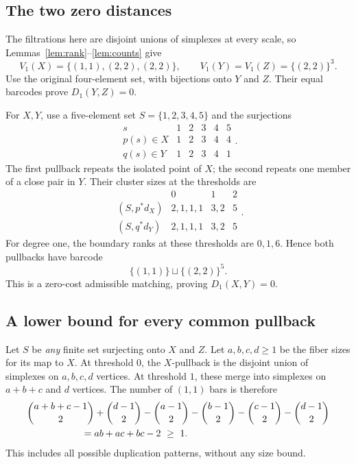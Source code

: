 \documentclass[11pt]{article}
\theoremstyle{remark}
\newcommand{\sq}{\sqcup}
\newcommand{\barc}[2]{\{(#1,#1)\}^{#2}}
\begin{document}
\subsection{The two zero distances}
The filtrations here are disjoint unions of simplexes at every scale, so
Lemmas~\ref{lem:rank}--\ref{lem:counts} give
\begin{equation}
V_1(X)=\{(1,1),(2,2),(2,2)\},\qquad
V_1(Y)=V_1(Z)=\barc{2}{3}.
\label{eq:base}
\end{equation}
Use the original four-element set, with bijections onto $Y$ and $Z$.
Their equal barcodes prove $D_1(Y,Z)=0$.

For $X,Y$, use a five-element set $S=\{1,2,3,4,5\}$ and the surjections
\begin{equation}
\begin{array}{c|ccccc}
s&1&2&3&4&5\\\hline
p(s)\in X&1&2&3&4&4\\
q(s)\in Y&1&2&3&4&1
\end{array}.
\label{eq:witness}
\end{equation}
The first pullback repeats the isolated point of $X$; the second repeats
one member of a close pair in $Y$. Their cluster sizes at the thresholds
are
\[
\begin{array}{c|ccc}
&0&1&2\\\hline
(S,p^*d_X)&2,1,1,1&3,2&5\\
(S,q^*d_Y)&2,1,1,1&3,2&5
\end{array}.
\]
For degree one, the boundary ranks at these thresholds are $0,1,6$.
Hence both pullbacks have barcode
\begin{equation}
\{(1,1)\}\sq\barc{2}{5}.
\label{eq:pullback}
\end{equation}
This is a zero-cost admissible matching, proving $D_1(X,Y)=0$.

\subsection{A lower bound for every common pullback}
Let $S$ be \emph{any} finite set surjecting onto $X$ and $Z$.
Let $a,b,c,d\ge1$ be the fiber sizes for its map to $X$.
At threshold $0$, the $X$-pullback is the disjoint union of simplexes
on $a,b,c,d$ vertices. At threshold $1$, these merge into simplexes
on $a+b+c$ and $d$ vertices. The number of $(1,1)$ bars is therefore
\begin{align}
&\binom{a+b+c-1}{2}+\binom{d-1}{2}
 -\binom{a-1}{2}-\binom{b-1}{2}-\binom{c-1}{2}-\binom{d-1}{2}\notag\\
&\hspace{2cm}=ab+ac+bc-2\ \ge\ 1.
\label{eq:positive}
\end{align}
This includes all possible duplication patterns, without any size bound.
\end{document}

